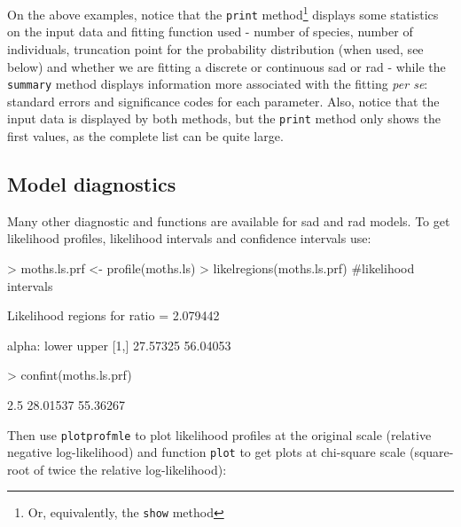 \documentclass[11pt, A4]{article}
\newcommand{\code}[1]{\texttt{#1}}
\begin{document}
On the above examples, notice that the \code{print} method\footnote{Or, equivalently, the \code{show} method}
displays some statistics on the input data and 
fitting function used - number of species, number of individuals, truncation point for the probability 
distribution (when used, see below) and whether we are fitting a discrete or
continuous sad or rad - while the \code{summary} method displays information more associated with the
fitting \emph{per se}: standard errors and significance codes for each parameter. Also, notice that
the input data is displayed by both methods, but the \code{print} method only shows the first values, as the
complete list can be quite large.

\subsection{Model diagnostics}
\label{sec:model-diagnostics}
Many other diagnostic and functions are available for sad and rad models. 
To get likelihood profiles, likelihood intervals and confidence intervals use:


\begin{Schunk}
\begin{Sinput}
> moths.ls.prf <- profile(moths.ls)
> likelregions(moths.ls.prf) #likelihood intervals
\end{Sinput}
\begin{Soutput}
Likelihood regions for ratio = 2.079442 

 alpha:
        lower    upper
[1,] 27.57325 56.04053
\end{Soutput}
\begin{Sinput}
> confint(moths.ls.prf)
\end{Sinput}
\begin{Soutput}
   2.5 %
28.01537 55.36267 
\end{Soutput}
\end{Schunk}

Then use \code{plotprofmle} to plot likelihood profiles at the original scale (relative negative log-likelihood)
and function \code{plot} to get plots at chi-square scale (square-root of twice the relative log-likelihood):

\end{document}
